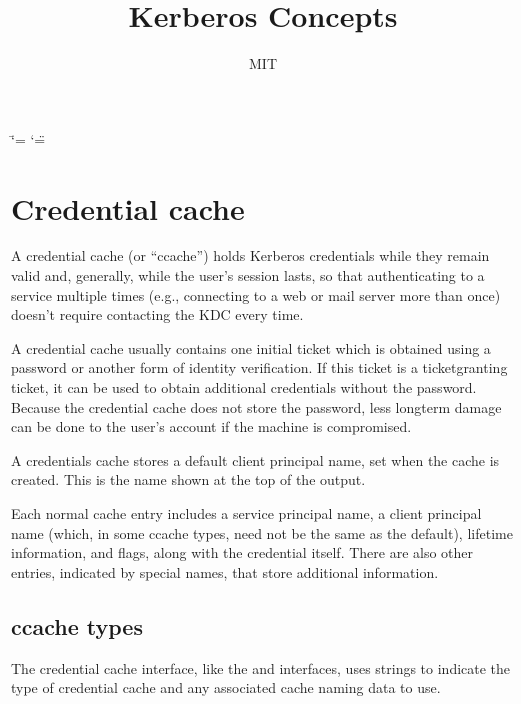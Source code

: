 \documentclass[letterpaper,10pt,english]{sphinxmanual}
\title{Kerberos Concepts}
\date{ }
\author{MIT}
\begin{document}
\ifdefined\shorthandoff
  \ifnum\catcode`\=\string=\active\shorthandoff{=}\fi
  \ifnum\catcode`\"=\active{}\fi
\fi

\pagestyle{empty}
\sphinxmaketitle
\pagestyle{plain}
\sphinxtableofcontents
\pagestyle{normal}
\label{\detokenize{basic/index::doc}}


\sphinxstepscope


\chapter{Credential cache}
\label{\detokenize{basic/ccache_def:credential-cache}}\label{\detokenize{basic/ccache_def:ccache-definition}}\label{\detokenize{basic/ccache_def::doc}}
\sphinxAtStartPar
A credential cache (or “ccache”) holds Kerberos credentials while they
remain valid and, generally, while the user’s session lasts, so that
authenticating to a service multiple times (e.g., connecting to a web
or mail server more than once) doesn’t require contacting the KDC
every time.

\sphinxAtStartPar
A credential cache usually contains one initial ticket which is
obtained using a password or another form of identity verification.
If this ticket is a ticket\sphinxhyphen{}granting ticket, it can be used to obtain
additional credentials without the password.  Because the credential
cache does not store the password, less long\sphinxhyphen{}term damage can be done
to the user’s account if the machine is compromised.

\sphinxAtStartPar
A credentials cache stores a default client principal name, set when
the cache is created.  This is the name shown at the top of the
  output.

\sphinxAtStartPar
Each normal cache entry includes a service principal name, a client
principal name (which, in some ccache types, need not be the same as
the default), lifetime information, and flags, along with the
credential itself.  There are also other entries, indicated by special
names, that store additional information.


\section{ccache types}
\label{\detokenize{basic/ccache_def:ccache-types}}
\sphinxAtStartPar
The credential cache interface, like the {\hyperref[\detokenize{basic/keytab_def:keytab-definition}]{}} and
{\hyperref[\detokenize{basic/rcache_def:rcache-definition}]{}} interfaces, uses  strings to
indicate the type of credential cache and any associated cache naming
data to use.
\end{document}

